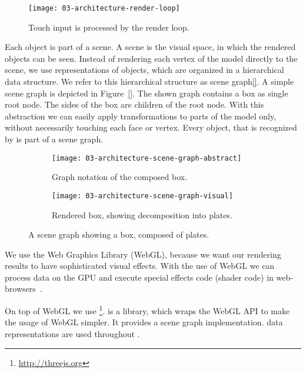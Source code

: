 \documentclass[../ClassicThesis.tex]{subfiles}
\begin{document}
\begin{figure}[h]
  \centering
  \texttt{[image: 03-architecture-render-loop]}
  \caption{Touch input is processed by the render loop.}
  \label{fig:render-loop}
\end{figure}

Each object is part of a scene. A scene is the visual space, in which
the rendered objects can be seen. Instead of rendering each vertex of
the model directly to the scene, we use representations of objects,
which are organized in a hierarchical data structure. We refer to this
hierarchical structure as scene graph\ref{}. A simple scene graph is depicted in
Figure~\ref{}. The shown graph contains a box as single root node. The
sides of the box are children of the root node. With this abstraction
we can easily apply transformations to parts of the model only,
without necessarily touching each face or vertex. Every object, that
is recognized by {\convertify} is part of a scene graph.

\begin{figure}[H]
  \centering
  \begin{subfigure}[b]{0.49\textwidth}
    \centering
    \texttt{[image: 03-architecture-scene-graph-abstract]}
    \caption{Graph notation of the composed box.}
    \label{fig:scene-graph:abstract}
  \end{subfigure}
  \begin{subfigure}[b]{0.49\textwidth}
    \centering
    \texttt{[image: 03-architecture-scene-graph-visual]}
    \caption{Rendered box, showing decomposition into plates.}
    \label{fig:scene-graph:visual}
  \end{subfigure}
  \caption{A scene graph showing a box, composed of plates.}
  \label{fig:scene-graph}
\end{figure}

 We use the Web Graphics Library
(WebGL), because we want our rendering results to have
sophisticated visual effects. With the use of WebGL we can
process data on the GPU and execute special effects code
(shader code) in web-browsers~\cite{mdn-webgl}.

On top of WebGL we use
{\threejs}\footnote{\url{http://threejs.org}}. {\threejs} is
a {\javascript} library, which wraps the WebGL API to make
the usage of WebGL simpler. It provides a scene graph
implementation. {\threejs}
data representations are used throughout {\convertify}.
\end{document}
